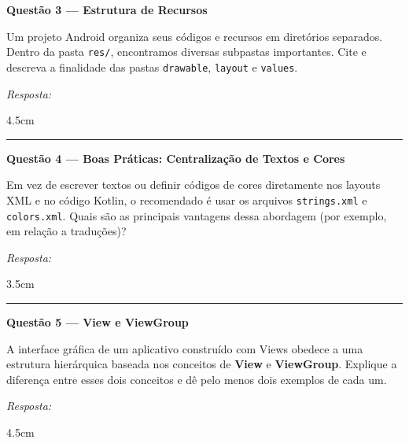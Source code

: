 \documentclass[12pt]{article}
\begin{document}
\noindent\textbf{Questão 3 — Estrutura de Recursos}

\vspace{0.2cm}
\noindent
Um projeto Android organiza seus códigos e recursos em diretórios separados. Dentro da pasta \texttt{res/}, encontramos diversas subpastas importantes. Cite e descreva a finalidade das pastas \texttt{drawable}, \texttt{layout} e \texttt{values}.

\vspace{0.3cm}
\noindent\textit{Resposta:}
\begin{resposta}{4.5cm}
\end{resposta}

\vspace{0.6cm}
\noindent\rule{\textwidth}{0.8pt}
\vspace{0.3cm}

\noindent\textbf{Questão 4 — Boas Práticas: Centralização de Textos e Cores}

\vspace{0.2cm}
\noindent
Em vez de escrever textos ou definir códigos de cores diretamente nos layouts XML e no código Kotlin, o recomendado é usar os arquivos \texttt{strings.xml} e \texttt{colors.xml}. Quais são as principais vantagens dessa abordagem (por exemplo, em relação a traduções)?

\vspace{0.3cm}
\noindent\textit{Resposta:}
\begin{resposta}{3.5cm}
\end{resposta}

\vspace{0.6cm}
\noindent\rule{\textwidth}{0.8pt}
\vspace{0.3cm}

\noindent\textbf{Questão 5 — View e ViewGroup}

\vspace{0.2cm}
\noindent
A interface gráfica de um aplicativo construído com Views obedece a uma estrutura hierárquica baseada nos conceitos de \textbf{View} e \textbf{ViewGroup}. Explique a diferença entre esses dois conceitos e dê pelo menos dois exemplos de cada um.

\vspace{0.3cm}
\noindent\textit{Resposta:}
\begin{resposta}{4.5cm}
\end{resposta}
\end{document}

